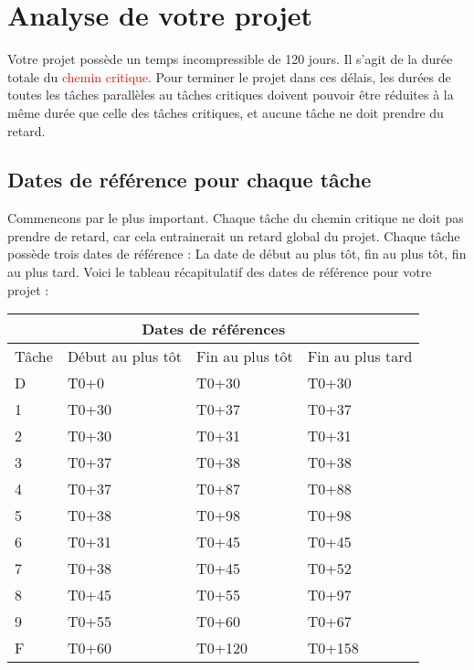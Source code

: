 \documentclass{article}
\begin{document}
\section{Analyse de votre projet}
Votre projet possède un temps incompressible de 120 jours.
    Il s'agit de la durée totale du \textcolor{red}{chemin critique}.
    Pour terminer le projet dans ces délais, les durées de toutes les tâches parallèles au tâches critiques doivent pouvoir être réduites
    à la même durée que celle des tâches critiques, et aucune tâche ne doit prendre du retard.\subsection{Dates de référence pour chaque tâche}Commencons par le plus important. Chaque tâche du chemin critique ne doit pas prendre de
    retard, car cela entrainerait un retard global du projet.
    Chaque tâche possède trois dates de référence : La date de début au plus tôt,
    fin au plus tôt, fin au plus tard.
    Voici le tableau récapitulatif des dates de référence pour votre projet :\newline 
\begin{tabular}{ |p{3cm}||p{3cm}|p{3cm}|p{3cm}|  }
        \hline
        \multicolumn{4}{|c|}{Dates de références} \\
        \hline 
        Tâche&Début au plus tôt&Fin au plus tôt&Fin au plus tard \\ 
        \hline 
 D&T0+0&T0+30&T0+30 \\ 
 1&T0+30&T0+37&T0+37 \\ 
 2&T0+30&T0+31&T0+31 \\ 
 3&T0+37&T0+38&T0+38 \\ 
 4&T0+37&T0+87&T0+88 \\ 
 5&T0+38&T0+98&T0+98 \\ 
 6&T0+31&T0+45&T0+45 \\ 
 7&T0+38&T0+45&T0+52 \\ 
 8&T0+45&T0+55&T0+97 \\ 
 9&T0+55&T0+60&T0+67 \\ 
 F&T0+60&T0+120&T0+158 \\ 
\hline
    \end{tabular} 
\end{document}
